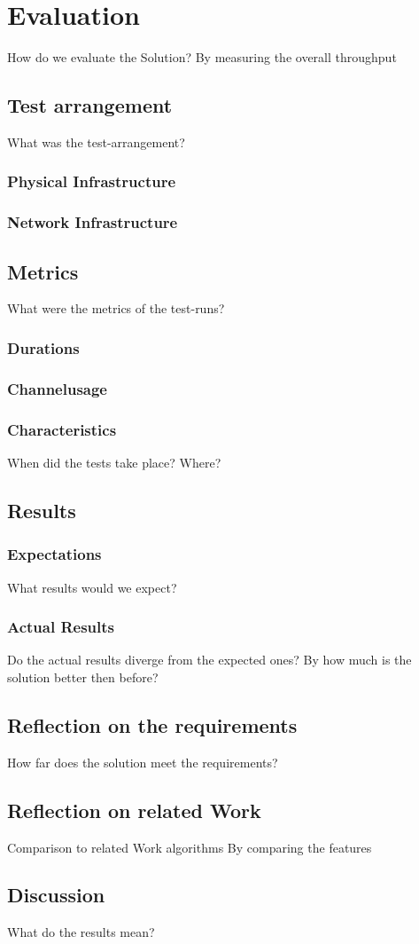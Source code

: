 \chapter{Evaluation}
How do we evaluate the Solution?\newline
  By measuring the overall throughput\newline
\section{Test arrangement}
What was the test-arrangement?
  \subsection{Physical Infrastructure}
  \subsection{Network Infrastructure}
\section{Metrics}
What were the metrics of the test-runs?\newline
  \subsection{Durations}
  \subsection{Channelusage}
  \subsection{Characteristics}
    When did the tests take place?\newline
    Where?\newline
\section{Results}
\subsection{Expectations}
  What results would we expect?\newline
\subsection{Actual Results}
  Do the actual results diverge from the expected ones?\newline
  By how much is the solution better then before?
\section{Reflection on the requirements}
  How far does the solution meet the requirements?\newline
\section{Reflection on related Work}
  Comparison to related Work algorithms\newline
  By comparing the features\newline
\section{Discussion}
  What do the results mean?
